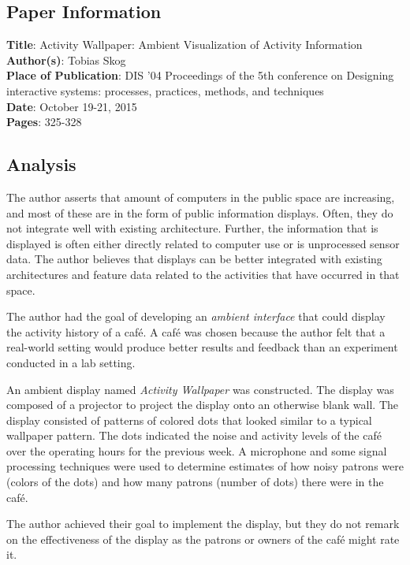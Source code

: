 \documentclass{article}
\begin{document}
\subsection{Paper Information}
\noindent
\textbf{Title}: Activity Wallpaper: Ambient Visualization of Activity Information \\
\textbf{Author(s)}: Tobias Skog \\
\textbf{Place of Publication}: DIS '04 Proceedings of the 5th conference on Designing interactive systems: processes, practices, methods, and techniques \\
\textbf{Date}: October 19-21, 2015 \\
\textbf{Pages}: 325-328 \\

\subsection{Analysis}
The author asserts that amount of computers in the public space are increasing, and most of these are in the form of public information displays. Often, they do not integrate well with existing architecture. Further, the information that is displayed is often either directly related to computer use or is unprocessed sensor data. The author believes that displays can be better integrated with existing architectures and feature data related to the activities that have occurred in that space.

The author had the goal of developing an \emph{ambient interface} that could display the activity history of a caf\'{e}. A caf\'{e} was chosen because the author felt that a real-world setting would produce better results and feedback than an experiment conducted in a lab setting.

An ambient display named \emph{Activity Wallpaper} was constructed. The display was composed of a projector to project the display onto an otherwise blank wall. The display consisted of patterns of colored dots that looked similar to a typical wallpaper pattern. The dots indicated the noise and activity levels of the caf\'{e} over the operating hours for the previous week. A microphone and some signal processing techniques were used to determine estimates of how noisy patrons were (colors of the dots) and how many patrons (number of dots) there were in the caf\'{e}.

The author achieved their goal to implement the display, but they do not remark on the effectiveness of the display as the patrons or owners of the caf\'{e} might rate it.
\end{document}
